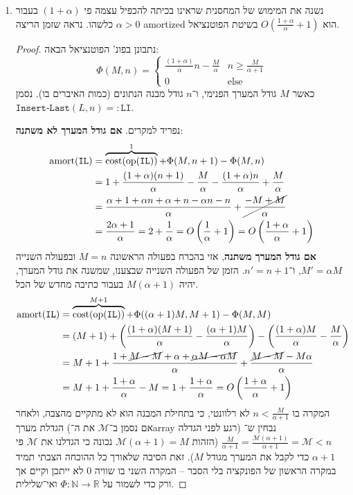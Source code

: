 \documentclass[]{article}
\newcommand\N     {\mathbb{N}}
\newcommand\R     {\mathbb{R}}
\newcommand\other {\mathrm{else}}
\newcommand\co        {\colon}
\newcommand\ag        {\alpha}
\newcommand\cl [1]    {\left ( #1 \right )}
\theoremstyle{definition}
\DeclareMathOperator\amort   {amort}
\DeclareMathOperator\cost    {cost}
\begin{document}
	\begin{enumerate}
		\item נשנה את המימוש של המחסנית שראינו בכיתה להכפיל עצמה פי $(1 + \ag)$ בעבור $\ag > 0$ כלשהו. נראה שזמן הריצה amortized הוא $O\cl{\frac{1 + \ag}{\ag} + 1}$ בשיטת הפוטנציאל. \begin{proof}
			נתבונן בפונ' הפוטנציאל הבאה: \\
			\[ \Phi(M, n) = \begin{cases}
				\frac{(1 + \ag)}{\ag}n - \frac{M}{\ag} & n \ge \frac{M}{\ag + 1} \\
				0 & \other
			\end{cases} \]
			כאשר $M$ גודל המערך הפנימי, ו־$n$ גודל מבנה הנתונים (כמות האיברים בו). נסמן $\texttt{Insert-Last}(L, n) =: \texttt{LI}$. 
			
			נפריד למקרים. \textbf{אם גודל המערך לא משתנה}: 
			\begin{align*}
				\amort(\texttt{IL}) &= \overbrace{\cost(\mathrm{op}(\texttt{IL}))}^{1} + \Phi(M, n + 1) - \Phi(M, n) \\
				&= 1 + \frac{(1 + \ag)(n + 1)}{\ag}- \frac{M}{\ag} - \frac{(1 + \ag)n}{\ag} + \frac{M}{\ag} \\
				&= \frac{\ag + 1 + \ag n + \ag + n - \ag n - n}{\ag} + \cancel{\frac{ - M + M}{\ag}} \\
				&= \frac{2\ag + 1}{\ag} = 2 + \frac{1}{\ag} = O\cl{\frac{1}{\ag} + 1} = O\cl{\frac{1 + \ag}{\ag} + 1}
			\end{align*}
			\textbf{אם גודל המערך משתנה}, אזי בהכרח בפעולה הראשונה $M = n$ ובפעולה השנייה $M' = \ag M$, ו־$n' = n + 1$. הזמן של הפעולה השנייה שבצענו, שמשנה את גודל המערך, יהיה $M(\ag + 1)$ בעבור כתיבה מחדש של הכל. 
			\begin{align*}
				\amort(\texttt{IL}) &= \overbrace{\cost(\mathrm{op}(\texttt{IL}))}^{M + 1} + \Phi((\ag + 1)M, M + 1) - \Phi(M, M) \\
				&= \cl{M + 1} + \cl{\frac{(1 + \ag)(M + 1)}{\ag} - \frac{(\ag + 1)M}{\ag}} - \cl{\frac{(1+ \ag)M}{\ag} - \frac{M}{\ag}} \\
				&= M + 1 + \frac{1 + \cancel{M - M} + \ag + \cancel{\ag M - \ag M}}{\ag} + \frac{\cancel{M - M} -M\ag}{\ag} \\
				&= M + 1 + \frac{1 + \ag}{\ag} - M = 1 + \frac{1 + \ag}{\ag} = O\cl{\frac{1 + \ag}{\ag} + 1}
			\end{align*}
			המקרה בו $n < \frac{M}{\ag + 1}$ לא רלוונטי, כי בתחילת המבנה הוא לא מתקיים מהצבה, ולאחר הגדלת מערך (אם נסמן ב־$\mathcal{M}$ את ה־array רגע לפני הגדלה) נבחין ש־$\frac{M}{\ag + 1} = \frac{\mathcal{M}(\ag + 1)}{\ag + 1} = \mathcal{M} < n$ (הזהות $\mathcal{M}(\ag + 1) = M$ נכונה כי הגדלנו את $\mathcal{M}$ פי $\ag + 1$ כדי לקבל את המערך מגודל $M$). זאת הסיבה שלאורך כל ההוכחה הצבתי תמיד במקרה הראשון של הפונקציה בלי הסבר – המקרה השני בו שוויה $0$ לא ייתכן וקיים אך ורק כדי לשמור על $\Phi \co \N \to \R$ ואי־שלילית. 
			

\end{proof}
\end{enumerate}
\end{document}
